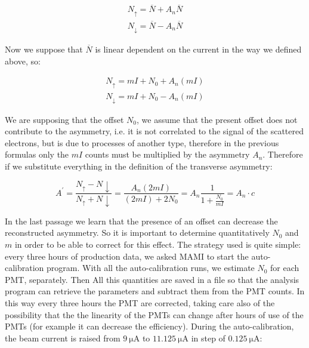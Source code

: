 \begin{align*}
N_{\uparrow} = \overline{N} + A_{n}\overline{N} \\
N_{\downarrow} = \overline{N} - A_{n}\overline{N} 
\end{align*}

Now we suppose that $\overline{N}$ is linear dependent on the current in the way we defined above, so:

\begin{align*}
N_{\uparrow} = mI + N_{0} + A_{n}(mI) \\
N_{\downarrow} = mI + N_{0} - A_{n}(mI) 
\end{align*}

We are supposing that the offset $N_{0}$, we assume that the present offset does not contribute to the asymmetry, i.e. it is not correlated to the signal of the scattered electrons, but is due to processes of another type, therefore in the previous formulas only the $mI$ counts must be multiplied by the asymmetry $A_{n}$. Therefore if we substitute everything in the definition of the transverse asymmetry:

\begin{equation} \label{eq:Systematic}
A^{'} = \dfrac{N_{\uparrow} - N{\downarrow}}{N_{\uparrow} + N{\downarrow}} = \dfrac{A_{n} (2mI)}{ (2mI) + 2N_{0} } = A_{n} \dfrac{1}{1 + \frac{N_{0}}{mI}} = A_{n}\cdot c
\end{equation} 

In the last passage we learn that the presence of an offset can decrease the reconstructed asymmetry. So it is important to determine quantitatively $N_{0}$ and $m$ in order to be able to correct for this effect. The strategy used is quite simple: every three hours of production data, we asked MAMI to start the auto-calibration program. With all the auto-calibration runs, we estimate $N_{0}$ for each PMT, separately. Then All this quantities are saved in a file so that the analysis program can retrieve the parameters and subtract them from the PMT counts.
In this way every three hours the PMT are corrected, taking care also of the possibility that the the linearity of the PMTs can change after hours of use of the PMTs (for example it can decrease the efficiency).
During the auto-calibration, the beam current is raised from $\SI{9}{\micro \ampere}$ to $\SI{11.125}{\micro \ampere}$ in step of $\SI{0.125}{\micro \ampere}$:

